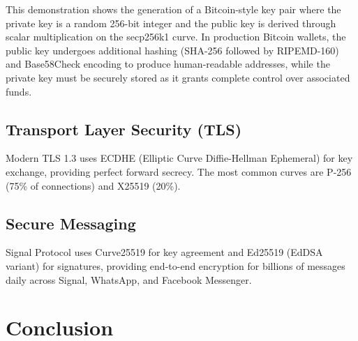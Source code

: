 \documentclass[a4paper, 11pt]{article}
\begin{document}
This demonstration shows the generation of a Bitcoin-style key pair where the private key is a random 256-bit integer and the public key is derived through scalar multiplication on the secp256k1 curve. In production Bitcoin wallets, the public key undergoes additional hashing (SHA-256 followed by RIPEMD-160) and Base58Check encoding to produce human-readable addresses, while the private key must be securely stored as it grants complete control over associated funds.

\subsection{Transport Layer Security (TLS)}

Modern TLS 1.3 uses ECDHE (Elliptic Curve Diffie-Hellman Ephemeral) for key exchange, providing perfect forward secrecy. The most common curves are P-256 (75\% of connections) and X25519 (20\%).

\subsection{Secure Messaging}

Signal Protocol uses Curve25519 for key agreement and Ed25519 (EdDSA variant) for signatures, providing end-to-end encryption for billions of messages daily across Signal, WhatsApp, and Facebook Messenger.

\section{Conclusion}
\end{document}
